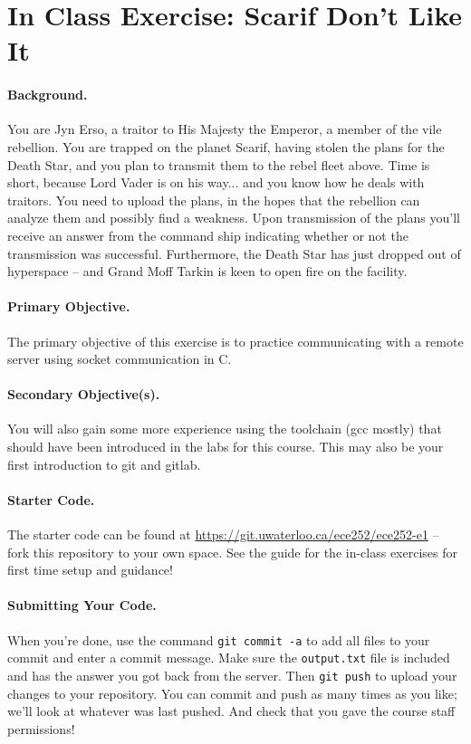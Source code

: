 




\section*{In Class Exercise: Scarif Don't Like It}

\paragraph{Background.}
You are Jyn Erso, a traitor to His Majesty the Emperor, a member of the vile rebellion. You are trapped on the planet Scarif, having stolen the plans for the Death Star, and you plan to transmit them to the rebel fleet above. Time is short, because Lord Vader is on his way... and you know how he deals with traitors. You need to upload the plans, in the hopes that the rebellion can analyze them and possibly find a weakness. Upon transmission of the plans you'll receive an answer from the command ship indicating whether or not the transmission was successful. Furthermore, the Death Star has just dropped out of hyperspace -- and Grand Moff Tarkin is keen to open fire on the facility.

\paragraph{Primary Objective.} The primary objective of this exercise is to practice communicating with a remote server using socket communication in C. 

\paragraph{Secondary Objective(s).} You will also gain some more experience using the toolchain (gcc mostly) that should have been introduced in the labs for this course. This may also be your first introduction to git and gitlab.

\paragraph{Starter Code.} The starter code can be found at \url{https://git.uwaterloo.ca/ece252/ece252-e1} -- fork this repository to your own space. See the guide for the in-class exercises for first time setup and guidance!

\paragraph{Submitting Your Code.} When you're done, use the command \texttt{git commit -a} to add all files to your commit and enter a commit message. Make sure the \texttt{output.txt} file is included and has the answer you got back from the server. Then \texttt{git push} to upload your changes to your repository. You can commit and push as many times as you like; we'll look at whatever was last pushed. And check that you gave the course staff permissions!

